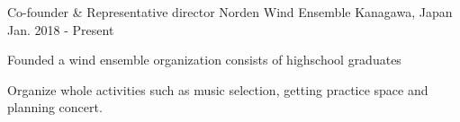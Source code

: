 \begin{cventries}
  \cventry
    {Co-founder \& Representative director} %
    {Norden Wind Ensemble} %
    {Kanagawa, Japan} %
    {Jan. 2018 - Present} %
    {
      \begin{cvitems} %
        \item {Founded a wind ensemble organization consists of highschool graduates}
        \item {Organize whole activities such as music selection, getting practice space and planning concert.}
      \end{cvitems}
    }
\end{cventries}


